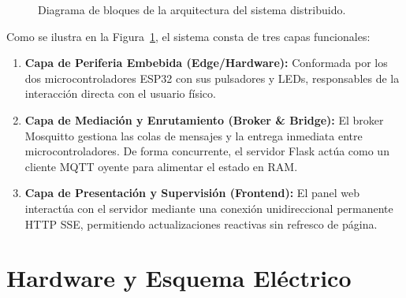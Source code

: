\documentclass[11pt,a4paper]{article}
\begin{document}
\begin{figure}[htbp]
    \caption{Diagrama de bloques de la arquitectura del sistema distribuido.}
    \label{fig:arquitectura_bloques}
\end{figure}

Como se ilustra en la Figura~\ref{fig:arquitectura_bloques}, el sistema consta de tres capas funcionales:
\begin{enumerate}
    \item \textbf{Capa de Periferia Embebida (Edge/Hardware):} Conformada por los dos microcontroladores ESP32 con sus pulsadores y LEDs, responsables de la interacción directa con el usuario físico.
    \item \textbf{Capa de Mediación y Enrutamiento (Broker \& Bridge):} El broker Mosquitto gestiona las colas de mensajes y la entrega inmediata entre microcontroladores. De forma concurrente, el servidor Flask actúa como un cliente MQTT oyente para alimentar el estado en RAM.
    \item \textbf{Capa de Presentación y Supervisión (Frontend):} El panel web interactúa con el servidor mediante una conexión unidireccional permanente HTTP SSE, permitiendo actualizaciones reactivas sin refresco de página.
\end{enumerate}

\section{Hardware y Esquema Eléctrico}
\end{document}

